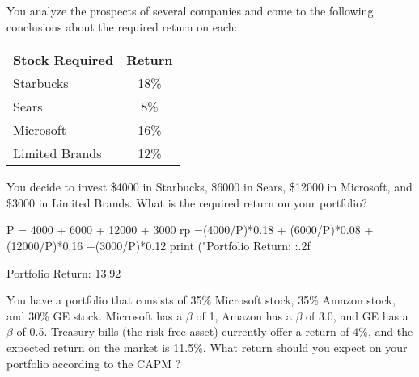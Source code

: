 \begin{question}
You analyze the prospects of several companies and come to the following conclusions about the required return on each:

\begin{center}
\begin{tabular}{lc}
\textbf{Stock Required} & \textbf{Return} \\
Starbucks &18\% \\
Sears &8\% \\
Microsoft &16\% \\
Limited Brands &12\% \\
\end{tabular}
\end{center}

You decide to invest \$4000 in Starbucks, \$6000 in Sears, \$12000 in Microsoft, and \$3000 in Limited Brands. What is the required return on your portfolio?
\end{question}

\cprotEnv \begin{solution}
\begin{ipython}
P = 4000 + 6000 + 12000 + 3000
rp =(4000/P)*0.18 + (6000/P)*0.08 + (12000/P)*0.16 +(3000/P)*0.12
print ("Portfolio Return: {:.2f}%

Portfolio Return: 13.92%
\end{ipython}
\end{solution}	

\begin{question}
You have a portfolio that consists of 35\% Microsoft stock, 35\% Amazon stock, and 30\% GE stock. Microsoft has a $\beta$ of 1, Amazon has a $\beta$ of 3.0, and GE has a $\beta$ of 0.5. Treasury bills (the risk-free asset) currently offer a return of 4\%, and the expected return on the market is 11.5\%. What return should you expect on your portfolio according to the CAPM ? 
\end{question}

